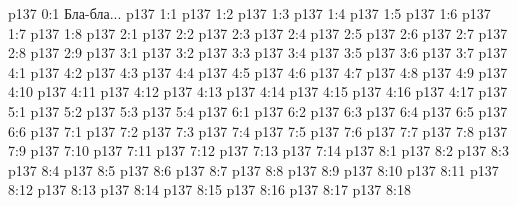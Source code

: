 \author{Промежуточные создания}
\vs p137 0:1  Бла-бла...
\vs p137 1:1 
\vs p137 1:2 \pc 
\vs p137 1:3 
\vs p137 1:4 \pc 
\vs p137 1:5 \pc 
\vs p137 1:6 
\vs p137 1:7 
\vs p137 1:8 \pc 
{}
\vs p137 2:1 
\vs p137 2:2 
\vs p137 2:3 \pc 
\vs p137 2:4 
\vs p137 2:5 
\vs p137 2:6 \pc 
\vs p137 2:7 
\vs p137 2:8 \pc 
\vs p137 2:9 
\vs p137 3:1 
\vs p137 3:2 
\vs p137 3:3 
\vs p137 3:4 \pc 
\vs p137 3:5 
\vs p137 3:6 \pc 
\vs p137 3:7 
\vs p137 4:1 
\vs p137 4:2 
\vs p137 4:3 
\vs p137 4:4 
\vs p137 4:5 
\vs p137 4:6 \pc 
\vs p137 4:7 \pc 
\vs p137 4:8 
\vs p137 4:9 
\vs p137 4:10 
\vs p137 4:11 
\vs p137 4:12 
\vs p137 4:13 
\vs p137 4:14 
\vs p137 4:15 \pc 
\vs p137 4:16 
\vs p137 4:17 
\vs p137 5:1 
\vs p137 5:2 
\vs p137 5:3 
\vs p137 5:4 
\vs p137 6:1 
\vs p137 6:2 
\vs p137 6:3 
\vs p137 6:4 \pc 
\vs p137 6:5 
\vs p137 6:6 
\vs p137 7:1 
\vs p137 7:2 
\vs p137 7:3 
\vs p137 7:4 
\vs p137 7:5 
\vs p137 7:6 \pc 
\vs p137 7:7 \pc 
\vs p137 7:8 \pc 
\vs p137 7:9 \pc 
\vs p137 7:10 \pc 
\vs p137 7:11 \pc 
\vs p137 7:12 \pc 
\vs p137 7:13 
\vs p137 7:14 
\vs p137 8:1 
\vs p137 8:2 
\vs p137 8:3 
\vs p137 8:4 \pc 
\vs p137 8:5 
\vs p137 8:6 \pc 
\vs p137 8:7 
\vs p137 8:8 
\vs p137 8:9 
\vs p137 8:10 
\vs p137 8:11 
\vs p137 8:12 
\vs p137 8:13 
\vs p137 8:14 
\vs p137 8:15 
\vs p137 8:16 
\vs p137 8:17 
\vs p137 8:18 \pc 
\quizlink
